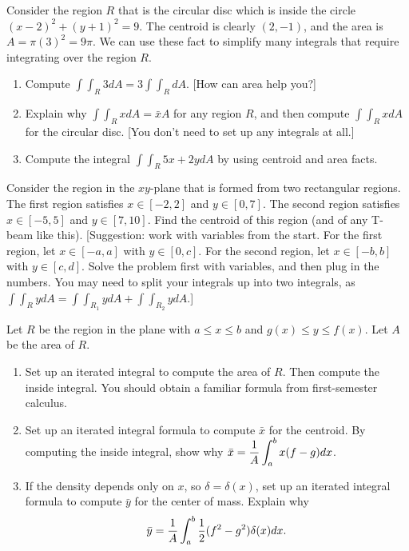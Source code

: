\begin{problem}\label{centroid trick}
Consider the region $R$ that is the circular disc which is inside the circle $(x-2)^2+(y+1)^2=9$. The centroid is clearly $(2,-1)$, and the area is $A=\pi(3)^2=9\pi$.  We can use these fact to simplify many integrals that require integrating over the region $R$.  
\begin{enumerate}
 \item Compute $\int\int_R 3dA = 3\int\int_RdA$.  [How can area help you?]
 \item Explain why $\int\int_R x dA = \bar x A$ for any region $R$, and then compute $\int\int_R x dA$ for the circular disc. [You don't need to set up any integrals at all.]
 \item Compute the integral $\int\int_R 5x+2y dA$ by using centroid and area facts.
\end{enumerate}
\end{problem}

\begin{problem}
Consider the region in the $xy$-plane that is formed from two rectangular regions.  The first region satisfies $x\in[-2,2]$ and $y\in[0,7]$.  The second region satisfies $x\in[-5,5]$ and $y\in[7,10]$.  Find the centroid of this region (and of any T-beam like this).
[Suggestion: work with variables from the start. For the first region, let $x\in[-a,a]$ with $y\in[0,c]$.  For the second region, let $x\in[-b,b]$ with $y\in[c,d]$. Solve the problem first with variables, and then plug in the numbers. You may need to split your integrals up into two integrals, as $\int\int_R ydA = \int\int_{R_1}ydA +\int\int_{R_2}ydA$.]
\end{problem}


\begin{problem}
Let $R$ be the region in the plane with $a\leq x\leq b$ and $g(x)\leq y\leq f(x)$.  Let $A$ be the area of $R$.
\begin{enumerate}
 \item Set up an iterated integral to compute the area of $R$.  Then compute the inside integral. You should obtain a familiar formula from first-semester calculus.
 \item 
Set up an iterated integral formula to compute $\bar x$ for the centroid. By computing the inside integral, show why $\displaystyle\bar x = \frac{1}{A}\int_a^b x (f-g)dx$.
 \item If the density depends only on $x$, so $\delta = \delta (x)$, set up an iterated integral formula to compute $\bar y$ for the center of mass. Explain why $$\displaystyle\bar y = \frac{1}{A}\int_a^b  \frac{1}{2}(f^2-g^2)\delta(x)dx.$$
\end{enumerate}
\end{problem}


